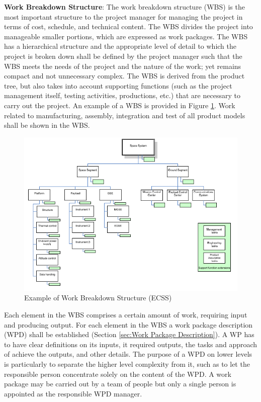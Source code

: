 \textbf{Work Breakdown Structure}: The work breakdown structure (WBS) is the most important structure to the project manager for managing the project in terms of cost, schedule, and technical content. The WBS divides the project into manageable smaller portions, which are expressed as work packages. The WBS has a hierarchical structure and the appropriate level of detail to which the project is broken down shall be defined by the project manager such that the WBS meets the needs of the project and the nature of the work; yet remains compact and not unnecessary complex. The WBS is derived from the product tree, but also takes into account supporting functions (such as the project management itself, testing activities, productions, etc.) that are necessary to carry out the project. An example of a WBS is provided in Figure \ref{fig:Example of Work Breakdown Structure}. Work related to manufacturing, assembly, integration and test of all product models shall be shown in the WBS.

\begin{figure}[h]
\centering\includegraphics[scale=1.0]{fig/example_of_work_breakdown_structure}
\caption{Example of Work Breakdown Structure (ECSS)}
\label{fig:Example of Work Breakdown Structure}
\end{figure}

Each element in the WBS comprises a certain amount of work, requiring input and producing output. For each element in the WBS a work package description (WPD) shall be established (Section \ref{sec:Work Package Description}). A WP has to have clear definitions on its inputs, it required outputs, the tasks and approach of achieve the outputs, and other details. The purpose of a WPD on lower levels is particularly to separate the higher level complexity from it, such as to let the responsible person concentrate solely on the content of the WPD. A work package may be carried out by a team of people but only a single person is appointed as the responsible WPD manager.

